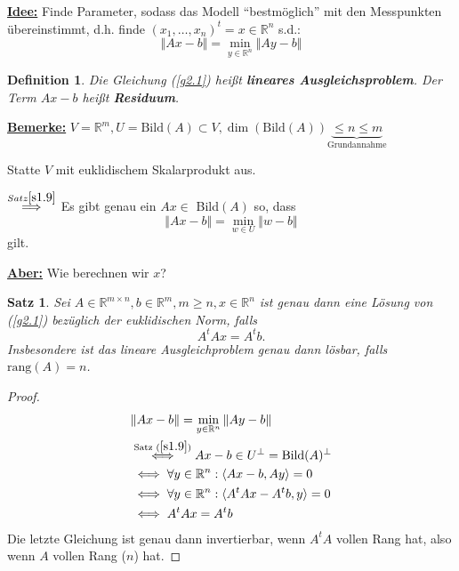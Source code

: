 \documentclass{book}
\newtheorem{theorem}[algorithm]{Satz}
\newtheorem{definition}[algorithm]{Definition}
\def\R{\mathbb{R}}
\def\rang{\text{rang}}
\begin{document}
            \underline{\textbf{Idee:}} Finde Parameter, sodass das Modell ``bestmöglich'' mit den Messpunkten übereinstimmt, 
            d.h. finde $(x_1,\dots,x_n)^t=x\in\R^n$ s.d.:
            \begin{equation}\label{g2.1}
                \Vert Ax-b \Vert=\min_{y\in\R^n} \Vert Ay-b \Vert
            \end{equation}
            
            \begin{definition}\label{d2.2}
                Die Gleichung (\ref{g2.1}) heißt \textbf{lineares Ausgleichsproblem}. Der Term $Ax-b$ heißt \textbf{Residuum}.
            \end{definition}

            \underline{\textbf{Bemerke:}} $V=\R^m,U=\text{Bild}(A)\subset V,\dim(\text{Bild}(A))\underbrace{\leq n\leq m}_{\text{Grundannahme}}$

            Statte $V$ mit euklidischem Skalarprodukt aus.

            $\stackrel{Satz \ref{s1.9}}{\implies}$ Es gibt genau ein $Ax\in$ Bild$(A)$ so, dass
            \[\Vert Ax-b \Vert=\min_{w\in U} \Vert w-b \Vert\]
            gilt.

            \underline{\textbf{Aber:}} Wie berechnen wir $x$?

            \begin{theorem}\label{s2.3}
                Sei $A\in\R^{m\times n},b\in\R^m,m\geq n,x\in\R^n$ ist genau dann eine Lösung von (\ref{g2.1}) 
                bezüglich der euklidischen Norm, falls
                \begin{equation}\label{g2.2}
                    A^tAx=A^tb.
                \end{equation}
                Insbesondere ist das lineare Ausgleichproblem genau dann lösbar, falls $\rang(A)=n$.
            \end{theorem}

            \begin{proof}
                \begin{align*}
                    &\Vert Ax-b \Vert=\min_{y\in\R^n} \Vert Ay-b \Vert\\
                    &\stackrel{\text{Satz } (\ref{s1.9})}{\iff}Ax-b\in U^\perp=\text{Bild}(A)^\perp\\
                    &\iff \forall y\in\R^n: \langle Ax-b, Ay\rangle=0\\
                    &\iff \forall y\in\R^n: \langle A^tAx-A^tb,y \rangle=0\\
                    &\iff A^tAx=A^tb
                \end{align*}
                Die letzte Gleichung ist genau dann invertierbar, wenn $A^tA$ vollen Rang hat, also wenn $A$ vollen Rang ($n$) hat.
            \end{proof}
\end{document}
